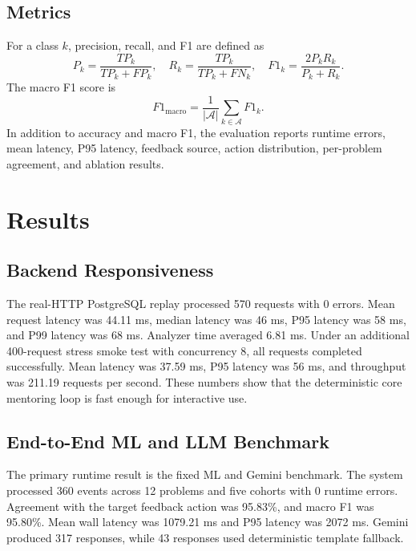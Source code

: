 \documentclass[twoside, 11pt]{article}
\begin{document}
\subsection{Metrics}

For a class $k$, precision, recall, and F1 are defined as
\begin{equation}
P_k=\frac{TP_k}{TP_k+FP_k},\quad
R_k=\frac{TP_k}{TP_k+FN_k},\quad
F1_k=\frac{2P_kR_k}{P_k+R_k}.
\end{equation}
The macro F1 score is
\begin{equation}
F1_{\mathrm{macro}}=\frac{1}{|\mathcal{A}|}\sum_{k \in \mathcal{A}} F1_k.
\end{equation}
In addition to accuracy and macro F1, the evaluation reports runtime errors, mean latency, P95 latency, feedback source, action distribution, per-problem agreement, and ablation results.

\section{\large Results}

\subsection{Backend Responsiveness}

The real-HTTP PostgreSQL replay processed 570 requests with 0 errors. Mean request latency was 44.11 ms, median latency was 46 ms, P95 latency was 58 ms, and P99 latency was 68 ms. Analyzer time averaged 6.81 ms. Under an additional 400-request stress smoke test with concurrency 8, all requests completed successfully. Mean latency was 37.59 ms, P95 latency was 56 ms, and throughput was 211.19 requests per second. These numbers show that the deterministic core mentoring loop is fast enough for interactive use.

\subsection{End-to-End ML and LLM Benchmark}

The primary runtime result is the fixed ML and Gemini benchmark. The system processed 360 events across 12 problems and five cohorts with 0 runtime errors. Agreement with the target feedback action was 95.83\%, and macro F1 was 95.80\%. Mean wall latency was 1079.21 ms and P95 latency was 2072 ms. Gemini produced 317 responses, while 43 responses used deterministic template fallback.
\end{document}
